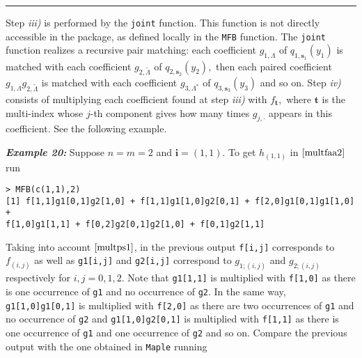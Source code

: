 \noindent

\rule{13cm}{0.4pt}

Step \emph{iii)} is performed by the \texttt{joint} function. This function is not directly accessible in the package, as defined locally in the \texttt{MFB} function. The \texttt{joint} function realizes a recursive pair matching: each coefficient \(g_{1, \Lambda}\) of \(q_{1,\boldsymbol{s}_1}(y_1)\) is matched with each coefficient \(g_{2, \tilde{\Lambda}}\) of \(q_{2,\boldsymbol{s}_2}(y_2),\) then each paired coefficient \(g_{1, \Lambda} g_{2, \tilde{\Lambda}}\) is matched with each coefficient \(g_{3, \Lambda^{\!*}}\) of \(q_{3,\boldsymbol{s}_3}(y_3)\) and so on. Step \emph{iv)} consists of multiplying each coefficient found at step \emph{iii)} with \(f_{\boldsymbol{t}},\) where \(\boldsymbol{t}\) is the multi-index whose \(j\)-th component gives how many times \(g_{j, \cdot}\) appears in this coefficient. See the following example.

\hskip-0.5cm\textbf{\emph{Example 20:}} Suppose \(n=m=2\) and \(\boldsymbol{i}=(1,1).\)
To get \(h_{(1,1)}\) in \(\eqref{multfaa2}\) run

\begin{verbatim}
> MFB(c(1,1),2)
[1] f[1,1]g1[0,1]g2[1,0] + f[1,1]g1[1,0]g2[0,1] + f[2,0]g1[0,1]g1[1,0] + 
f[1,0]g1[1,1] + f[0,2]g2[0,1]g2[1,0] + f[0,1]g2[1,1]
\end{verbatim}

Taking into account \(\eqref{multps1}\), in the previous output \texttt{f{[}i,j{]}} corresponds to \(f_{(i,j)}\) as well as \texttt{g1{[}i,j{]}} and \texttt{g2{[}i,j{]}} correspond to \(g_{1;(i,j)}\) and \(g_{2;(i,j)}\) respectively for \(i,j=0,1,2.\) Note that \texttt{g1{[}1,1{]}} is multiplied with \texttt{f{[}1,0{]}} as there is one occurrence of \texttt{g1} and no occurrence of \texttt{g2}. In the same way, \texttt{g1{[}1,0{]}g1{[}0,1{]}} is multiplied with \texttt{f{[}2,0{]}} as there are two occurrences of \texttt{g1} and no occurrence of \texttt{g2} and \texttt{g1{[}1,0{]}g2{[}0,1{]}} is multiplied with \texttt{f{[}1,1{]}} as there is one occurrence of \texttt{g1} and one occurrence of \texttt{g2} and so on. Compare the previous output with the one obtained in \texttt{Maple} running

